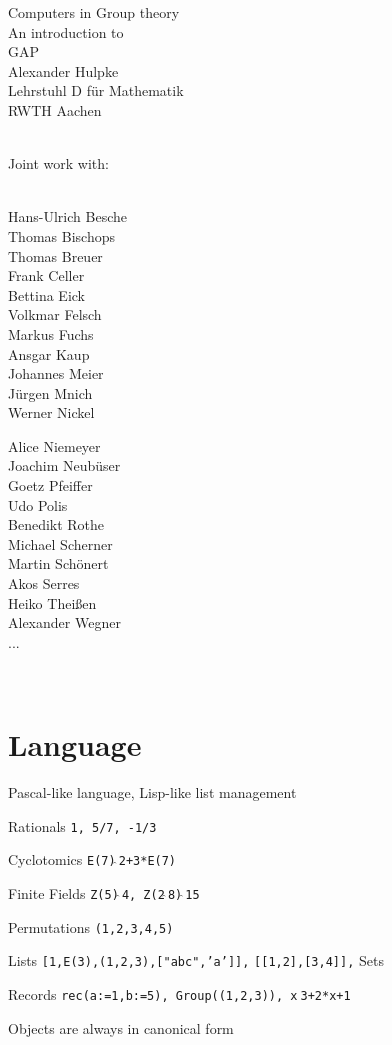 \documentclass{article}
\newcommand\hut{$\hat{\ }$}
\newcommand{\entrylabel}[1]{\mbox{#1}\hfil}
\def\Abschnitt#1{\section*{{\huge\bf #1}}}
\newenvironment{entry}
{\begin{list}{}%
{\renewcommand{\makelabel}{\entrylabel}%
\setlength{\labelwidth}{45mm}%
\setlength{\leftmargin}{50mm}%
}%
}%
{\end{list}}
\begin{document}
\pagestyle{empty}
\LARGE\sf
\begin{center}
Computers in Group theory\bigskip\\
An introduction to\bigskip\bigskip\\
{\Huge\sf GAP}\bigskip\\
{\large
Alexander Hulpke\\
Lehrstuhl D f\"ur Mathematik\\
RWTH Aachen\\
}
\end{center}
\vspace{2cm}\ \\
Joint work with:\\
\vspace{5mm}\ \\
\noindent
\begin{minipage}[t]{8cm}
Hans-Ulrich Besche\\
Thomas Bischops\\
Thomas Breuer\\
Frank Celler\\
Bettina Eick\\
Volkmar Felsch\\
Markus Fuchs\\
Ansgar Kaup\\
Johannes Meier\\
J\"urgen Mnich\\
Werner Nickel\\
\end{minipage}
\begin{minipage}[t]{8cm}
Alice Niemeyer\\
Joachim Neub\"user\\
Goetz Pfeiffer\\
Udo Polis\\
Benedikt Rothe\\
Michael Scherner\\
Martin Sch\"onert\\
Akos Serres\\
Heiko Thei\ss en\\
Alexander Wegner\\
...\\
\end{minipage}\\

\newpage
\Abschnitt{Language}
\noindent
Pascal-like language, Lisp-like list management
\begin{entry}
\item[Rationals] {\tt 1, 5/7, -1/3}
\item[Cyclotomics] {\tt E(7)\hut2+3*E(7)}
\item[Finite Fields] {\tt Z(5)\hut4, Z(2\hut8)\hut15}
\item[Permutations] {\tt (1,2,3,4,5)}
\item[Lists] {\tt [1,E(3),(1,2,3),["abc",'a']],} {\tt [[1,2],[3,4]],} Sets
\item[Records] {\tt rec(a:=1,b:=5), Group((1,2,3)), x\hut3+2*x+1}
\end{entry}
Objects are always in canonical form
\end{document}
